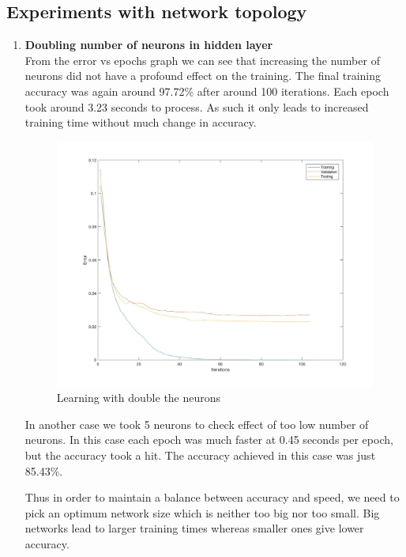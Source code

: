 \documentclass[11pt,twoside]{article}
\begin{document}
\subsection{Experiments with network topology}

\begin{enumerate}[label=(\alph*)]

\item \textbf{Doubling number of neurons in hidden layer}\\
From the error vs epochs graph we can see that increasing the number of neurons did not have a profound effect on the training. The final training accuracy was again around 97.72\% after around 100 iterations. Each epoch took around 3.23 seconds to process. As such it only leads to increased training time without much change in accuracy.

\begin{figure}[H]
  \includegraphics[width=1\columnwidth]{doubleneuron}
  \centering
  \caption{Learning with double the neurons}
  \label{fig:5_a}
  \end{figure}
 
In another case we took 5 neurons to check effect of too low number of neurons. In this case each epoch was much faster at 0.45 seconds per epoch, but the accuracy took a hit. The accuracy achieved in this case was just 85.43\%.

Thus in order to maintain a balance between accuracy and speed, we need to pick an optimum network size which is neither too big nor too small. Big networks lead to larger training times whereas smaller ones give lower accuracy.


\end{enumerate}
\end{document}
